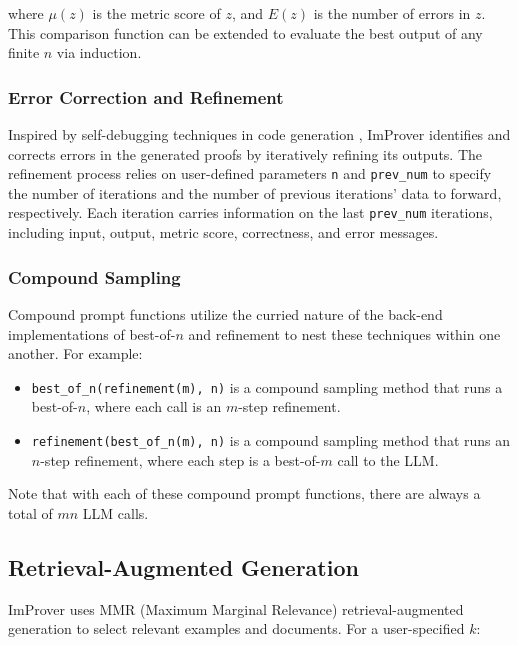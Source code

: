 where $\mu(z)$ is the metric score of $z$, and $E(z)$ is the number of errors in $z$. This comparison function can be extended to evaluate the best output of any finite $n$ via induction.

\subsubsection{Error Correction and Refinement}

Inspired by self-debugging techniques in code generation \cite{madaan2023selfrefine,chen2023teachinglargelanguagemodels}, ImProver identifies and corrects errors in the generated proofs by iteratively refining its outputs. The refinement process relies on user-defined parameters \verb|n| and \verb|prev_num| to specify the number of iterations and the number of previous iterations' data to forward, respectively. Each iteration carries information on the last \verb|prev_num| iterations, including input, output, metric score, correctness, and error messages.

\subsubsection{Compound Sampling}

Compound prompt functions utilize the curried nature of the back-end implementations of best-of-$n$ and refinement to nest these techniques within one another. For example:

\begin{itemize}
    \item \verb|best_of_n(refinement(m), n)| is a compound sampling method that runs a best-of-$n$, where each call is an $m$-step refinement.
    \item \verb|refinement(best_of_n(m), n)| is a compound sampling method that runs an $n$-step refinement, where each step is a best-of-$m$ call to the LLM.
\end{itemize}

Note that with each of these compound prompt functions, there are always a total of $mn$ LLM calls.

\subsection{Retrieval-Augmented Generation}
\label{ssec:improver_rag}

ImProver uses MMR (Maximum Marginal Relevance) \cite{10.1145/290941.291025} retrieval-augmented generation to select relevant examples and documents. For a user-specified $k$:


